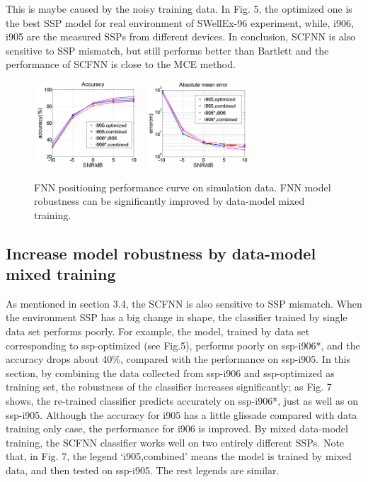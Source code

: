 This is maybe caused by the noisy training data. In Fig. 5, the optimized one is the best SSP model for real environment of SWellEx-96 experiment, while, i906, i905 are the measured SSPs from different devices.
In conclusion, SCFNN is also sensitive to SSP mismatch, but still performs better than Bartlett and the performance of SCFNN is close to the MCE method.
\begin{figure}
\includegraphics[width=4cm,height=3.2cm]{figure/Accuracy_to_SNR_Combined_vs_Single}
\includegraphics[width=4cm,height=3.2cm]{figure/Error_to_SNR_Combined_vs_Single}
\caption{FNN positioning performance curve on simulation data. FNN model robustness can be significantly improved by data-model mixed training.}
\end{figure}

\subsection{%
Increase model robustness by data-model mixed training}
As mentioned in section 3.4, the SCFNN is also sensitive to SSP mismatch. When the environment SSP has a big change in shape, the classifier trained by single data set performs poorly.
For example, the model, trained by data set corresponding to ssp-optimized (see Fig.5), performs poorly on ssp-i906{*}, and the accuracy drops about 40\%, compared with the performance on ssp-i905. In this section, by combining the data collected from ssp-i906 and ssp-optimized as training set, the robustness of the classifier increases significantly; as Fig. 7 shows, the re-trained classifier predicts accurately on ssp-i906{*}, just as well as on ssp-i905.
Although the accuracy for i905 has a little glissade compared with data training only case, the performance for i906 is improved. By mixed data-model training, the SCFNN classifier works well on two entirely different SSPs. Note that, in Fig. 7, the legend `i905,combined'  means the model is trained by mixed data, and then tested on ssp-i905. The rest legends are similar.
